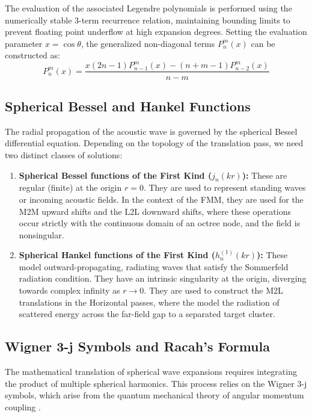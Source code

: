 The evaluation of the associated Legendre polynomials is performed using the numerically stable 3-term recurrence relation, maintaining bounding limits to prevent floating point underflow at high expansion degrees. Setting the evaluation parameter $x = \cos \theta$, the generalized non-diagonal terms $P_n^m(x)$ can be constructed as:
\begin{equation}\label{legendre-recurrence}
    P_n^m(x) = \frac{x(2n - 1)P_{n-1}^m(x) - (n + m - 1)P_{n-2}^m(x)}{n - m}
\end{equation}


\subsection{Spherical Bessel and Hankel Functions}
The radial propagation of the acoustic wave is governed by the spherical Bessel differential equation. Depending on the topology of the translation pass, we need two distinct classes of solutions:

\begin{enumerate}
    \item \textbf{Spherical Bessel functions of the First Kind ($j_n(kr)$):} These are regular (finite) at the origin $r = 0$. They are used to represent standing waves or incoming acoustic fields. In the context of the \ac{FMM}, they are used for the \ac{M2M} upward shifts and the \ac{L2L} downward shifts, where these operations occur strictly with the continuous domain of an octree node, and the field is nonsingular.
    \item \textbf{Spherical Hankel functions of the First Kind ($h_n^{(1)}(kr)$):} These model outward-propagating, radiating waves that satisfy the Sommerfeld radiation condition. They have an intrinsic singularity at the origin, diverging towards complex infinity as $r \to 0$. They are used to construct the \ac{M2L} translations in the Horizontal passes, where the model the radiation of scattered energy across the far-field gap to a separated target cluster.
\end{enumerate}

\subsection{Wigner 3-j Symbols and Racah's Formula}
The mathematical translation of spherical wave expansions requires integrating the product of multiple spherical harmonics. This process relies on the Wigner 3-j symbols, which arise from the quantum mechanical theory of angular momentum coupling \cite{gumerovrecursionscomputationmultipole2004}. 

